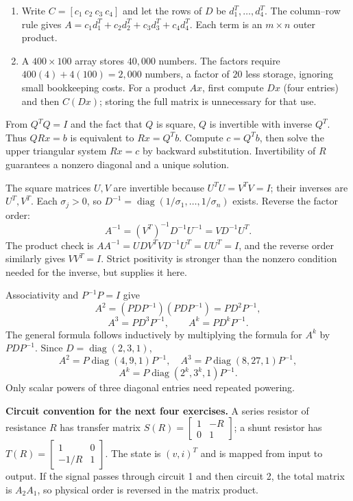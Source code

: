 \begin{enumerate}[label=(\alph*)]
\item Write $C=[c_1\ c_2\ c_3\ c_4]$ and let the rows of $D$ be
$d_1^T,\ldots,d_4^T$. The column--row rule gives
$A=c_1d_1^T+c_2d_2^T+c_3d_3^T+c_4d_4^T$.
Each term is an $m\times n$ outer product.
\item A $400\times100$ array stores $40{,}000$ numbers.
The factors require $400(4)+4(100)=2{,}000$ numbers, a factor
of $20$ less storage, ignoring small bookkeeping costs.
For a product $Ax$, first compute $Dx$ (four entries) and then
$C(Dx)$; storing the full matrix is unnecessary for that use.
\end{enumerate}

From $Q^TQ=I$ and the fact that $Q$ is square, $Q$ is invertible
with inverse $Q^T$. Thus $QRx=b$ is equivalent to
$Rx=Q^Tb$. Compute $c=Q^Tb$, then solve the upper triangular
system $Rx=c$ by backward substitution. Invertibility of $R$
guarantees a nonzero diagonal and a unique solution.

The square matrices $U,V$ are invertible because $U^TU=V^TV=I$;
their inverses are $U^T,V^T$. Each $\sigma_j>0$, so
$D^{-1}=\operatorname{diag}(1/\sigma_1,\ldots,1/\sigma_n)$ exists.
Reverse the factor order:
\[A^{-1}=(V^T)^{-1}D^{-1}U^{-1}=VD^{-1}U^T.\]
The product check is
$AA^{-1}=UDV^TVD^{-1}U^T=UU^T=I$, and the reverse order
similarly gives $VV^T=I$. Strict positivity is stronger than the
nonzero condition needed for the inverse, but supplies it here.

Associativity and $P^{-1}P=I$ give
\[A^2=(PDP^{-1})(PDP^{-1})=PD^2P^{-1},\]
\[A^3=PD^3P^{-1},\qquad A^k=PD^kP^{-1}.\]
The general formula follows inductively by multiplying the formula
for $A^k$ by $PDP^{-1}$. Since $D=\operatorname{diag}(2,3,1)$,
\[A^2=P\operatorname{diag}(4,9,1)P^{-1},\quad
A^3=P\operatorname{diag}(8,27,1)P^{-1},\]
\[A^k=P\operatorname{diag}(2^k,3^k,1)P^{-1}.\]
Only scalar powers of three diagonal entries need repeated powering.

\textbf{Circuit convention for the next four exercises.}
A series resistor of resistance $R$ has transfer matrix
$S(R)=\begin{bmatrix}1&-R\\0&1\end{bmatrix}$; a shunt resistor has
$T(R)=\begin{bmatrix}1&0\\-1/R&1\end{bmatrix}$.
The state is $(v,i)^T$ and is mapped from input to output.
If the signal passes through circuit 1 and then circuit 2, the total
matrix is $A_2A_1$, so physical order is reversed in the matrix product.

